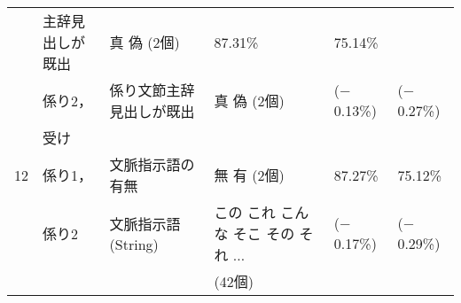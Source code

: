 \begin{table}[htbp]
\begin{center}
\begin{tabular}[c]{|c|l|l|l|l|l|}
      & 主辞見出しが既出 & 真 偽 (2個) & 87.31\% & 75.14\% \\
      & 係り2， & 係り文節主辞見出しが既出 & 真 偽 (2個) 
      & ($-$0.13\%) & ($-$0.27\%) \\
      & 受け & & & & \\
      \hline
      12 & 係り1，
      & 文脈指示語の有無 & 無 有 (2個) & 87.27\% & 75.12\% \\
      & 係り2 & 文脈指示語(String) & この これ こんな そこ その それ 
      $\ldots$ & ($-$0.17\%) & ($-$0.29\%) \\
      & & & \q\q\q\q\q\q (42個) & & \\
      \hline
    \end{tabular}
  \end{center}
\end{table}

